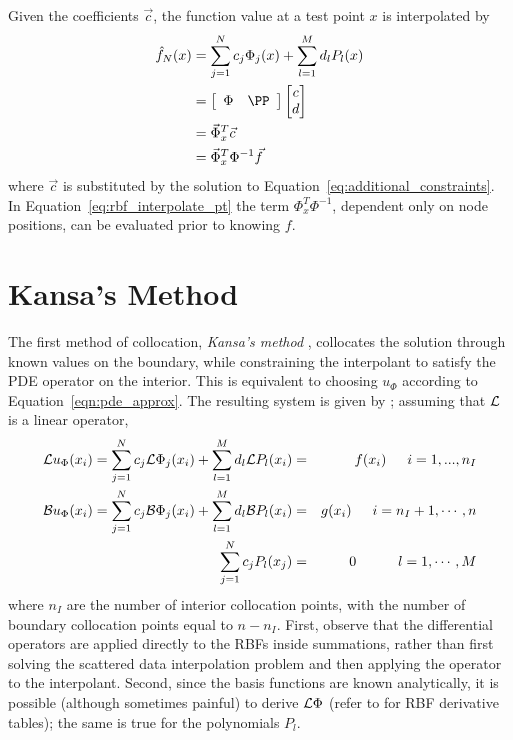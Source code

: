 \documentclass{report}
\begin{document}
{Given the coefficients $\vec{c}$, the function value at a test point $x$ is interpolated by
\begin{align}	 
	\hat{f}_N(x) &= \sum_{j=1}^{N}c_j \Phi_j(x) + \sum_{l=1}^{M}d_l P_l(x)  \nonumber \\
	&=  \left[\begin{array}{cc}
        \Phi & \PP
	\end{array} \right] 
	 \begin{bmatrix}	c \\
					d
		 \end{bmatrix} \nonumber \\
						 &= \vec{\Phi}_x^T \vec{c} \nonumber \\
						 &= \vec{\Phi}_x^T \Phi^{-1}\vec{f}	
						 \label{eq:rbf_interpolate_pt}
\end{align}
where $\vec{c}$ is substituted by the solution to Equation~\ref{eq:additional_constraints}. In Equation~\ref{eq:rbf_interpolate_pt} the term $\Phi_{x}^T\Phi^{-1}$, dependent only on node positions, can be evaluated prior to knowing $f$. 



\section{Kansa's Method}

The first method of collocation, \emph{Kansa's method} \cite{Kansa1990a, Kansa1990b}, collocates the solution through known values on the boundary, while constraining the interpolant to satisfy the PDE operator on the interior. This is equivalent to choosing $u_\Phi$ according to Equation~\ref{eqn:pde_approx}. The resulting system is given by \cite{Mouat2002}; assuming that $\mathcal{L}$ is a linear operator, 
\begin{eqnarray}
\mathcal{L}u_\Phi(x_i) = \sum_{j=1}^{N}c_j\mathcal{L}\Phi_j(x_i) + \sum_{l=1}^{M}d_l \mathcal{L}P_l(x_i) &=&f(x_i)  \hskip1.5em i = 1,...,n_I  \label{eqn:kansa_interior} \\ 
\mathcal{B}u_\Phi(x_i) = \sum_{j=1}^{N}c_j \mathcal{B}\Phi_j(x_i) + \sum_{l=1}^{M}d_l \mathcal{B}P_l(x_i) &=& g(x_i)  \hskip1.5em i = n_I + 1, \cdots, n \label{eqn:kansa_boundary} \\
\sum_{j=1}^{N} c_j P_l(x_j) & = & 0 \hskip3.0em l=1,\cdots,M \label{eqn:kansa_moments} 
\end{eqnarray}
where $n_I$ are the number of interior collocation points, with the number of boundary collocation points equal to $n - n_I$. First, observe that the differential operators are applied directly to the RBFs inside summations, rather than first solving the scattered data interpolation problem and then applying the operator to the interpolant.  Second, since the basis functions are known analytically, it is possible (although sometimes painful) to derive $\mathcal{L}\Phi$ (refer to \cite{Fasshauer2007} for RBF derivative tables); the same is true for the polynomials $P_l$. 

}
\end{document}
